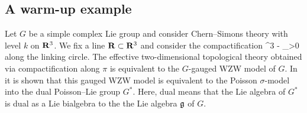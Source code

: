 \documentclass[../main.tex]{subfiles}
\begin{document}
 


\subsection{A warm-up example}

Let $G$ be a simple complex Lie group and consider Chern--Simons theory with level $k$ on $\mathbf{R}^3$.
We fix a line $\mathbf{R} \subset \mathbf{R}^3$ and consider the compactification
\beqn
\pi \colon \R^3 - \R \to \R \times \R_{>0}
\eeqn
along the linking circle.
The effective two-dimensional topological theory obtained via compactification along $\pi$ is equivalent to the $G$-gauged WZW model of $G$.
In \cite{FalcetoGawedzki} it is shown that this gauged WZW model is equivalent to the Poisson $\sigma$-model into the dual Poisson--Lie group $G^*$.
Here, dual means that the Lie algebra of $G^*$ is dual as a Lie bialgebra to the the Lie algebra $\mathfrak{g}$ of $G$.
\end{document}
